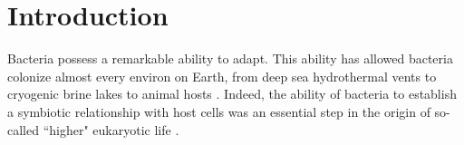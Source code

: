 \chapter{Introduction}
\ifpdf
    \graphicspath{{Introduction/IntroductionFigs/PNG/}{Introduction/IntroductionFigs/PDF/}{Introduction/IntroductionFigs/}}
\else
    \graphicspath{{Introduction/IntroductionFigs/EPS/}{Introduction/IntroductionFigs/}}
\fi

Bacteria possess a remarkable ability to adapt. This ability has allowed bacteria colonize almost every environ on Earth, from deep sea hydrothermal vents \parencite{Jorgensen1992} to cryogenic brine lakes \parencite{Murray2012} to animal hosts \parencite{Finlay1997}. Indeed, the ability of bacteria to establish a symbiotic relationship with host cells was an essential step in the origin of so-called ``higher" eukaryotic life \parencite{Sagan1967}. 